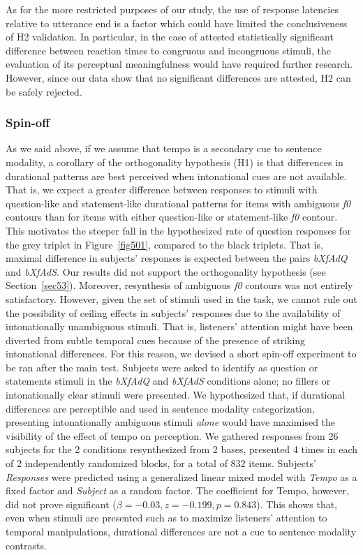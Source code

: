 As for the more restricted purposes of our study, the use of response latencies relative to utterance end is a factor which could have limited the conclusiveness of H2 validation. In particular, in the case of attested statistically significant difference between reaction times to congruous and incongruous stimuli, the evaluation of its perceptual meaningfulness would have required further research. However, since our data show that no significant differences are attested, H2 can be safely rejected.
\subsubsection{Spin-off}\label{sec5413}
As we said above, if we assume that tempo is a secondary cue to sentence modality, a corollary of the orthogonality hypothesis (H1) is that differences in durational patterns are best perceived when intonational cues are not available. That is, we expect a greater difference between responses to stimuli with question-like and statement-like durational patterns for items with ambiguous \textit{f0} contours than for items with either question-like or statement-like \textit{f0} contour. This motivates the steeper fall in the hypothesized rate of question responses for the grey triplet in Figure~\ref{fig501}, compared to the black triplets. That is, maximal difference in subjects' responses is expected between the pairs \textit{bXfAdQ} and \textit{bXfAdS}.
Our results did not support the orthogonality hypothesis (see Section~\ref{sec53}). Moreover, resynthesis of ambiguous \textit{f0} contours was not entirely satisfactory. However, given the set of stimuli used in the task, we cannot rule out the possibility of ceiling effects in subjects' responses due to the availability of intonationally unambiguous stimuli. That is, listeners' attention might have been diverted from subtle temporal cues because of the presence of striking intonational differences. For this reason, we devised a short spin-off experiment to be ran after the main test. Subjects were asked to identify as question or statements stimuli in the \textit{bXfAdQ} and \textit{bXfAdS} conditions alone; no fillers or intonationally clear stimuli were presented. We hypothesized that, if durational differences are perceptible and used in sentence modality categorization, presenting intonationally ambiguous stimuli \textit{alone} would have maximised the visibility of the effect of tempo on perception.
We gathered responses from 26 subjects for the 2 conditions resynthesized from 2 bases, presented 4 times in each of 2 independently randomized blocks, for a total of 832 items. Subjects' \textit{Responses} were predicted using a generalized linear mixed model with \textit{Tempo} as a fixed factor and \textit{Subject} as a random factor. The coefficient for Tempo, however, did not prove significant ($\beta=-0.03, z=-0.199, p=0.843$). This shows that, even when stimuli are presented such as to maximize listeners' attention to temporal manipulations, durational differences are not a cue to sentence modality contrasts.
